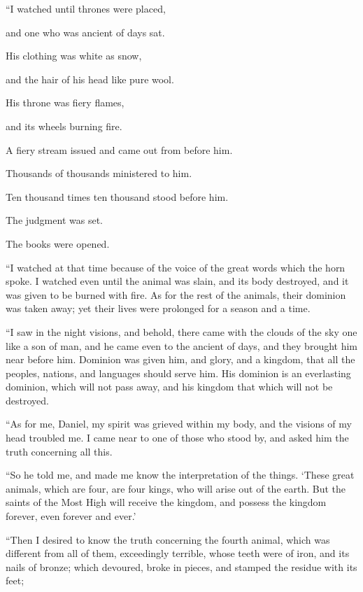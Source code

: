 {\par }{\Q {}“I watched until thrones were placed,
\par }{\QB and one who was ancient of days sat.
\par }{\Q His clothing was white as snow,
\par }{\QB and the hair of his head like pure wool.
\par }{\Q His throne was fiery flames,
\par }{\QB and its wheels burning fire.
\par }{\Q {}A fiery stream issued and came out from before him.
\par }{\QB Thousands of thousands ministered to him.
\par }{\QB Ten thousand times ten thousand stood before him.
\par }{\Q The judgment was set.
\par }{\QB The books were opened.
\par }{\PP {}“I watched at that time because of the voice of the great words which the horn spoke. I watched even until the animal was slain, and its body destroyed, and it was given to be burned with fire.
As for the rest of the animals, their dominion was taken away; yet their lives were prolonged for a season and a time.
\par }{\PP {}“I saw in the night visions, and behold, there came with the clouds of the sky one like a son of man, and he came even to the ancient of days, and they brought him near before him.
Dominion was given him, and glory, and a kingdom, that all the peoples, nations, and languages should serve him. His dominion is an everlasting dominion, which will not pass away, and his kingdom that which will not be destroyed.
\par }{\PP {}“As for me, Daniel, my spirit was grieved within my body, and the visions of my head troubled me.
I came near to one of those who stood by, and asked him the truth concerning all this.
\par }{\PP “So he told me, and made me know the interpretation of the things.
‘These great animals, which are four, are four kings, who will arise out of the earth.
But the saints of the Most High will receive the kingdom, and possess the kingdom forever, even forever and ever.’
\par }{\PP {}“Then I desired to know the truth concerning the fourth animal, which was different from all of them, exceedingly terrible, whose teeth were of iron, and its nails of bronze; which devoured, broke in pieces, and stamped the residue with its feet;
}
